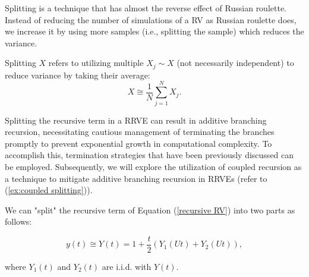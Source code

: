 \documentclass[a4paper,12pt]{article}
\begin{document}
Splitting is a technique that has almost the reverse effect of Russian roulette.
Instead of reducing the number of simulations of a RV as Russian roulette does,
we increase it by using more samples (i.e., splitting the sample) which
reduces the variance.

\begin{definition}[splitting] \label{def:splitting}
    Splitting $X$ refers to utilizing multiple $X_{j} \sim X$ (not necessarily independent) to
    reduce variance by taking their average:
    \begin{equation}
        X \cong \frac{1}{N} \sum_{j=1}^{N} X_{j}.
    \end{equation}
\end{definition}

Splitting the recursive term in a RRVE can result in additive branching recursion,
necessitating cautious management of terminating the branches promptly to prevent
exponential growth in computational complexity. To accomplish this, termination
strategies that have been previously discussed can be employed. Subsequently,
we will explore the utilization of coupled recursion as a technique to mitigate
additive branching recursion in RRVEs (refer to (\ref{ex:coupled splitting})).

\begin{example} \label{ex:splitting}
    We can "split" the recursive term of Equation (\ref{recursive RV})
    into two parts as follows:

    \begin{equation}
        y(t) \cong Y(t) = 1 + \frac{t}{2}(Y_{1}(Ut) + Y_{2}(Ut)),
    \end{equation}

    where $Y_{1}(t)$ and $Y_{2}(t)$ are i.i.d. with $Y(t)$.
\end{example}

\vspace{0.2cm}

\begin{pythonn}
\end{pythonn}

\end{document}
